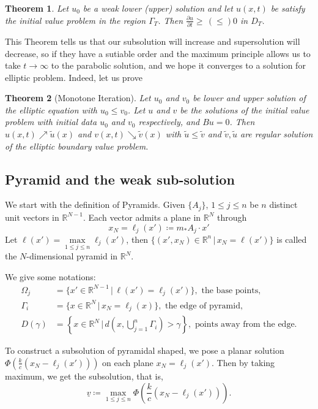 \documentclass[12pt, a4paper]{article}
\newtheorem{thm}{Theorem}[section]
\numberwithin{equation}{section}
\newcommand{\R}{\mathbb{R}}
\newcommand{\pd}[2]{\frac{\partial #1}{\partial #2}}
\begin{document}
\begin{CJK}{UTF8}{bkai}
\begin{thm}\cite[Theorem 3.4]{Sa1972}
	Let $u_0$ be a weak lower (upper) solution and let $u(x,t)$ be satisfy the initial value problem in the region $\Gamma_T$. Then $\pd{u}{t}\geq\,(\leq)0$ in $D_T$.
\end{thm}
 
This Theorem tells us that our subsolution will increase and supersolution will decrease, so if they have a sutiable order and the maximum principle allows us to take $t\to\infty$ to the parabolic solution, and we hope it converges to a solution for elliptic problem. Indeed, let us prove 

\begin{thm}[Monotone Iteration]\cite[Theorem3.6]{Sa1972}\label{thm2.4}
	Let $u_0$ and $v_0$ be lower and upper solution of the elliptic equation with $u_0\leq v_0$. Let $u$ and $v$ be the solutions of the initial value problem with initial data $u_0$ and $v_0$ respectively, and $Bu=0$. Then $u(x,t)\nearrow \tilde{u}(x)$ and $v(x,t)\searrow \tilde{v}(x)$ with $\tilde{u}\leq\tilde{v}$ and $\tilde{v},\tilde{u}$ are regular solution of the elliptic boundary value problem.
\end{thm}




\subsection{Pyramid and the weak sub-solution}

	We start with the definition of Pyramids. Given $\{A_j\}$, $1\leq j\leq n$ be $n$ distinct unit vectors in $\R^{N-1}$. Each vector admits a plane in $\R^N$ through
\[
	x_N=\ell_j(x')\coloneqq m_*A_j\cdot x'
\]
Let $\ell(x')=\max\limits_{1\leq j\leq n}\ell_j(x')$, then $\{(x',x_N)\in\R^n\,|\, x_N=\ell(x')\}$ is called the $N$-dimensional pyramid in $\R^N$.

We give some notations:
\begin{align}
	\Omega_j&=\{x'\in\R^{N-1}\,|\,\ell(x')=\ell_j(x')\},\mbox{ the base points,}\\
	\Gamma_i&=\{x\in\R^N\,|\,x_N=\ell_j(x)\},\mbox{ the edge of pyramid,}\\
	D(\gamma)&=\left\{x\in\R^N\,|\,d\left(x,\bigcup_{j=1}^n\Gamma_i\right)>\gamma\right\},\mbox{ points away from the edge.}\label{iden2.11}
\end{align}


	To construct a subsolution of pyramidal shaped, we pose a planar solution $\Phi\left(\frac{k}{c}(x_N-\ell_j(x'))\right)$ on each plane $x_N=\ell_j(x')$. Then by taking maximum, we get the subsolution, that is,
\begin{equation}\label{iden2.12}
	\underline{v}\coloneqq\max_{1\leq j\leq n}\Phi\left(\frac{k}{c}(x_N-\ell_j(x'))\right).
\end{equation}


\end{CJK}
\end{document}

